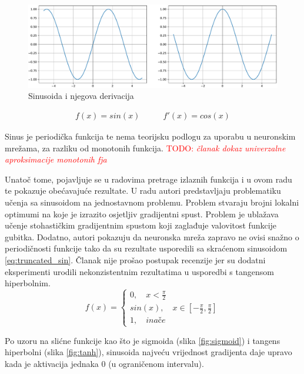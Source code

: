 \documentclass[times, utf8, diplomski]{fer}
\def\otherwise{\textit{inače}}
\def\figref#1{(slika \ref{#1})}
\def\TODO#1{\noindent\textcolor{red}{TODO: \textit{#1}}\newline}
\def\todo#1{\TODO{#1}}
\def\todoimg#1{\begin{center} \textcolor{red}{\big[ IMAGE: \textit{#1} \big]} \end{center}}
\begin{document}
\begin{figure}[H]
\includegraphics[width=\textwidth]{Sin.pdf}
\centering
\caption{Sinusoida i njegova derivacija}
\label{fig:sin}
\end{figure}

\begin{equation}
\begin{split}
f(x) = sin(x)
\end{split}
\qquad
\begin{split}
f'(x) = cos(x)
\end{split}
\end{equation}

Sinus je periodička funkcija te nema teorijsku podlogu za uporabu u neuronskim mrežama, za razliku od monotonih funkcija.
\todo{članak dokaz univerzalne aproksimacije monotonih fja}

Unatoč tome, pojavljuje se u radovima pretrage izlaznih funkcija \citep{elish} i u ovom radu te pokazuje obećavajuće rezultate. U radu \citet{taming_waves} autori predstavljaju problematiku učenja sa sinusoidom na jednostavnom problemu. Problem stvaraju brojni lokalni optimumi na koje je izrazito osjetljiv gradijentni spust. Problem je ublažava učenje stohastičkim gradijentnim spustom koji zaglađuje valovitost funkcije gubitka. Dodatno, autori pokazuju da neuronska mreža zapravo ne ovisi snažno o periodičnosti funkcije tako da su rezultate usporedili sa skraćenom sinusoidom \eqref{eq:truncated_sin}. Članak nije prošao postupak recenzije jer su dodatni eksperimenti urodili nekonzistentnim rezultatima u usporedbi s tangensom hiperbolnim.
\begin{equation}
\label{eq:truncated_sin}
f(x) =
\begin{cases}
0, \quad x < \frac{\pi}{2} \\
sin(x), \quad x \in [-\frac{\pi}{2},\frac{\pi}{2}] \\
1, \quad \otherwise
\end{cases}
\end{equation}
\todoimg{truncated sine}


Po uzoru na slićne funkcije kao što je sigmoida \figref{fig:sigmoid} i tangens hiperbolni \figref{fig:tanh}, sinusoida najveću vrijednost gradijenta daje upravo kada je aktivacija jednaka 0 (u ograničenom intervalu).
\end{document}
